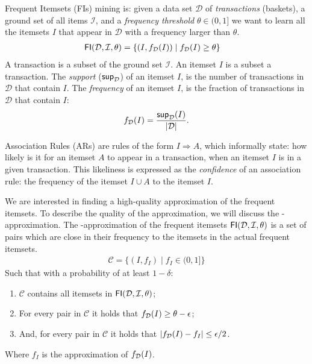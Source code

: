 \documentclass[../main.tex]{subfiles}
\begin{document}
Frequent Itemsets (FIs) mining is: given a data set $\mathcal{D}$ of \emph{transactions} (baskets),
a ground set of all items $\mathcal{I}$, and a \emph{frequency threshold} $\theta \in (0,1]$
we want to learn all the itemsets $I$ that appear in $\mathcal{D}$ with a frequency larger than $\theta$.
\begin{align*}
    \mathsf{FI}(\mathcal{D}, \mathcal{I}, \theta) &= \{(I, f_{\mathcal{D}}(I)) \mid f_{\mathcal{D}}(I) \ge \theta \}
\end{align*}
A transaction is a subset of the ground set $\mathcal{I}$.
An itemset $I$ is a subset a transaction.
The \emph{support} ($\mathsf{sup}_{\mathcal{D}}$) of an itemset $I$, is the number of transactions in $\mathcal{D}$ that contain $I$.
The \emph{frequency} of an itemset $I$, is the fraction of transactions in $\mathcal{D}$ that contain $I$:
\begin{align*}
    f_{\mathcal{D}}(I) = \frac{\mathsf{sup}_{\mathcal{D}}(I)}{\lvert\mathcal{D}\rvert}.
\end{align*}

Association Rules (ARs) are rules of the form $I \Rightarrow A$,
which informally state: how likely is it for an itemset $A$ to appear in a transaction, when an itemset $I$ is in a given transaction.
This likeliness is expressed as the \emph{confidence} of an association rule: the frequency of the itemset $I \cup A$ to the itemset $I$.
\cite{Riondato2012}

We are interested in finding a high-quality approximation of the frequent itemsets.
To describe the quality of the approximation, we will discuss the \FIapprox-approximation.
The \FIapprox-approximation of the frequent itemsets $\mathsf{FI}(\mathcal{D}, \mathcal{I}, \theta)$ is a set of pairs
which are close in their frequency to the itemsets in the actual frequent itemsets.
\begin{align*}
    \mathcal{C} = \{ (I, f_I) \mid f_I \in (0,1] \}
\end{align*}
Such that with a probability of at least $1 - \delta$:
\begin{enumerate}[noitemsep]
    \item $\mathcal{C}$ contains all itemsets in $\mathsf{FI}(\mathcal{D}, \mathcal{I}, \theta)$;
    \item For every pair in $\mathcal{C}$ it holds that $f_{\mathcal{D}}(I) \ge \theta - \epsilon$;
    \item And, for every pair in $\mathcal{C}$ it holds that $\lvert f_{\mathcal{D}}(I) - f_I\rvert \le \epsilon/2$.
\end{enumerate}
Where $f_I$ is the approximation of $f_{\mathcal{D}}(I)$.
\cite{Riondato2015}
\end{document}
